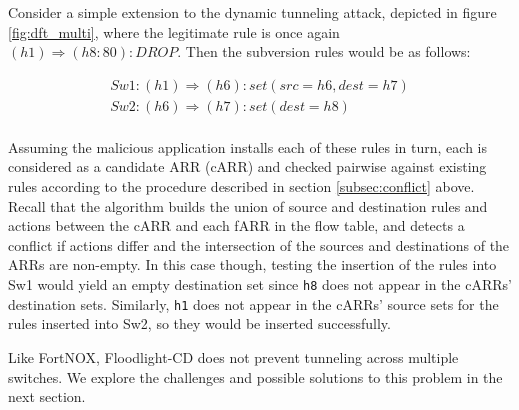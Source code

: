 Consider a simple extension to the dynamic tunneling attack, depicted in figure \ref{fig:dft_multi}, where the legitimate rule is once again $(h1) \Rightarrow (h8:80): DROP$. 
Then the subversion rules would be as follows: 

\begin{align}
  Sw1: (h1) \Rightarrow (h6): set(src=h6, dest=h7) \\
  Sw2: (h6) \Rightarrow (h7): set(dest=h8) \\
\end{align}

Assuming the malicious application installs each of these rules in turn, each is considered as a candidate ARR (cARR) and checked pairwise against existing rules according to the procedure described in section \ref{subsec:conflict} above. 
Recall that the algorithm builds the union of source and destination rules and actions between the cARR and each fARR in the flow table, and detects a conflict if actions differ and the intersection of the sources and destinations of the ARRs are non-empty. 
In this case though, testing the insertion of the rules into Sw1 would yield an empty destination set since \texttt{h8} does not appear in the cARRs' destination sets. 
Similarly, \texttt{h1} does not appear in the cARRs' source sets for the rules inserted into Sw2, so they would be inserted successfully. 

Like FortNOX, Floodlight-CD does not prevent tunneling across multiple switches.
We explore the challenges and possible solutions to this problem in the next section.



